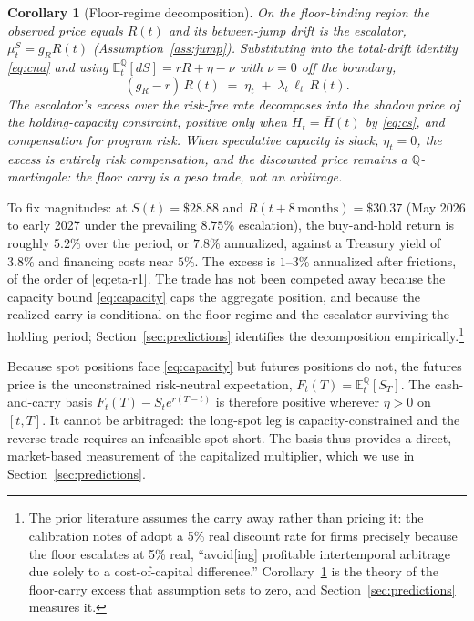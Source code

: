 \documentclass[11pt,letterpaper]{article}
\theoremstyle{plain}
\newtheorem{corollary}[theorem]{Corollary}
\theoremstyle{definition}
\newcommand{\E}{\mathbb{E}}                  %
\newcommand{\Qmeasure}{\mathbb{Q}}           %
\numberwithin{equation}{section}
\begin{document}
\begin{corollary}[Floor-regime decomposition]\label{cor:carry}
On the floor-binding region the observed price equals $R(t)$ and its between-jump drift is the escalator, $\mu^S_t = g_R R(t)$ (Assumption~\ref{ass:jump}). Substituting into the total-drift identity \eqref{eq:cna} and using $\E_t^\Qmeasure[dS]=rR+\eta-\nu$ with $\nu=0$ off the boundary,
\begin{equation}\label{eq:eta-r1}
  (g_R - r)\,R(t) \;=\; \eta_t \;+\; \lambda_t\,\ell_t\,R(t).
\end{equation}
The escalator's excess over the risk-free rate decomposes into the shadow price of the holding-capacity constraint, positive only when $H_t=\bar H(t)$ by \eqref{eq:cs}, and compensation for program risk. When speculative capacity is slack, $\eta_t=0$, the excess is entirely risk compensation, and the discounted price remains a $\Qmeasure$-martingale: the floor carry is a peso trade, not an arbitrage.
\end{corollary}

To fix magnitudes: at $S(t)=\$28.88$ and $R(t+8\,\text{months})=\$30.37$ (May 2026 to early 2027 under the prevailing $8.75\%$ escalation), the buy-and-hold return is roughly $5.2\%$ over the period, or $7.8\%$ annualized, against a Treasury yield of $3.8\%$ and financing costs near $5\%$. The excess is $1$--$3\%$ annualized after frictions, of the order of \eqref{eq:eta-r1}. The trade has not been competed away because the capacity bound \eqref{eq:capacity} caps the aggregate position, and because the realized carry is conditional on the floor regime and the escalator surviving the holding period; Section~\ref{sec:predictions} identifies the decomposition empirically.\footnote{The prior literature assumes the carry away rather than pricing it: the calibration notes of \citet{borenstein2019} adopt a 5\% real discount rate for firms precisely because the floor escalates at 5\% real, ``avoid[ing] profitable intertemporal arbitrage due solely to a cost-of-capital difference.'' Corollary~\ref{cor:carry} is the theory of the floor-carry excess that assumption sets to zero, and Section~\ref{sec:predictions} measures it.}

Because spot positions face \eqref{eq:capacity} but futures positions do not, the futures price is the unconstrained risk-neutral expectation, $F_t(T)=\E_t^{\Qmeasure}[S_T]$. The cash-and-carry basis $F_t(T)-S_te^{r(T-t)}$ is therefore positive wherever $\eta>0$ on $[t,T]$. It cannot be arbitraged: the long-spot leg is capacity-constrained and the reverse trade requires an infeasible spot short. The basis thus provides a direct, market-based measurement of the capitalized multiplier, which we use in Section~\ref{sec:predictions}.
\end{document}
